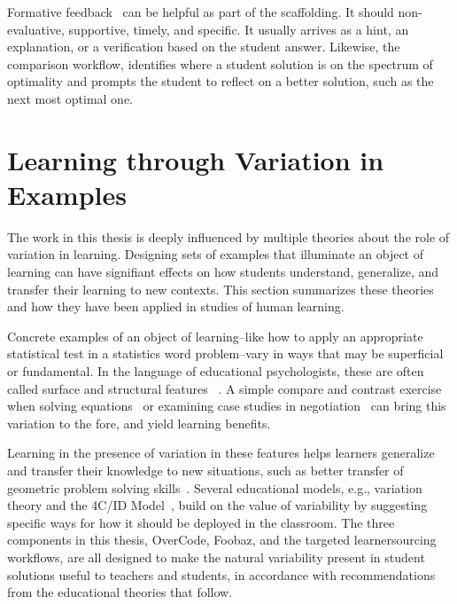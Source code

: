 Formative feedback~\cite{formative} can be helpful as part of the scaffolding. It should non-evaluative, supportive, timely, and specific. It usually arrives as a hint, an explanation, or a verification based on the student answer. Likewise, the comparison workflow, identifies where a student solution is on the spectrum of optimality and prompts the student to reflect on a better solution, such as the next most optimal one.

\section{Learning through Variation in Examples}

The work in this thesis is deeply influenced by multiple theories about the role of variation in learning. Designing sets of examples that illuminate an object of learning can have signifiant effects on how students understand, generalize, and transfer their learning to new contexts. This section summarizes these theories and how they have been applied in studies of human learning.


Concrete examples of an object of learning--like how to apply an appropriate statistical test in a statistics word problem--vary in ways that may be superficial or fundamental. In the language of educational psychologists, these are often called surface and structural features ~\cite{quilicimayer}. A simple compare and contrast exercise when solving equations~\cite{rittle2007does} or examining case studies in negotiation~\cite{loewenstein2003analogical} can bring this variation to the fore, and yield learning benefits.

Learning in the presence of variation in these features helps learners generalize and transfer their knowledge to new situations, such as better transfer of geometric problem solving skills~\cite{workedexamplesvariability,Variabilityofpractice}. Several educational models, e.g., variation theory and the 4C/ID Model~\cite{van2002blueprints}, build on the value of variability by suggesting specific ways for how it should be deployed in the classroom. The three components in this thesis, OverCode, Foobaz, and the targeted learnersourcing workflows, are all designed to make the natural variability present in student solutions useful to teachers and students, in accordance with recommendations from the educational theories that follow.


